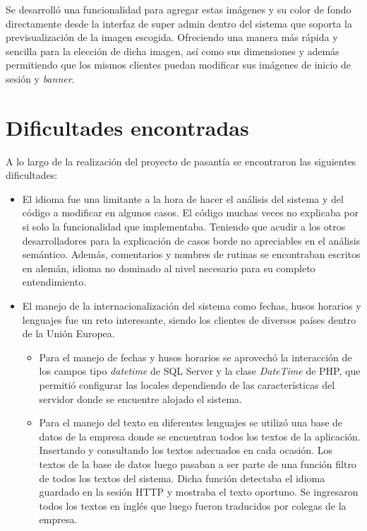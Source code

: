 	Se desarrolló una funcionalidad para agregar estas imágenes y su color de fondo directamente desde la interfaz de super admin dentro del sistema que soporta la previsualización de la imagen escogida. Ofreciendo una manera más rápida y sencilla para la elección de dicha imagen, así como sus dimensiones y además permitiendo que los mismos clientes puedan modificar sus imágenes de inicio de sesión y \emph{banner}. 


\section{Dificultades encontradas} %
\label{sec:dificultades_encontradas}

A lo largo de la realización del proyecto de pasantía se encontraron las siguientes dificultades:

\begin{itemize}
	\item El idioma fue una limitante a la hora de hacer el análisis del sistema y del código a modificar en algunos casos. El código muchas veces no explicaba por si solo la funcionalidad que implementaba. Teniendo que acudir a los otros desarrolladores para la explicación de casos borde no apreciables en el análisis semántico. Además, comentarios y nombres de rutinas se encontraban escritos en alemán, idioma no dominado al nivel necesario para su completo entendimiento.

	\item El manejo de la internacionalización del sistema como fechas, husos horarios y lenguajes fue un reto interesante, siendo los clientes de diversos países dentro de la Unión Europea. 
	
	\begin{itemize}
		\item Para el manejo de fechas y husos horarios se aprovechó la interacción de los campos tipo \emph{datetime} de SQL Server y la clase \emph{DateTime} de PHP, que permitió configurar las locales dependiendo de las características del servidor donde se encuentre alojado el sistema.

		\item Para el manejo del texto en diferentes lenguajes se utilizó una base de datos de la empresa donde se encuentran todos los textos de la aplicación. Insertando y consultando los textos adecuados en cada ocasión. Los textos de la base de datos luego pasaban a ser parte de una función filtro de todos los textos del sistema. Dicha función detectaba el idioma guardado en la sesión \gls{HTTP} y mostraba el texto oportuno. Se ingresaron todos los textos en inglés que luego fueron traducidos por colegas de la empresa.
	\end{itemize}

\end{itemize}




